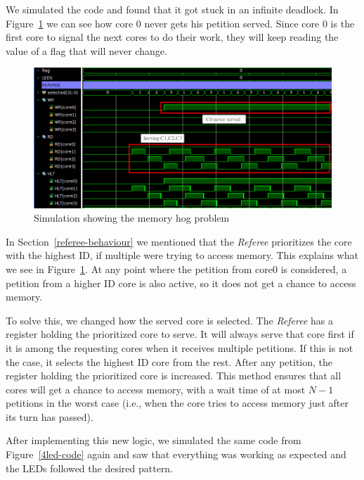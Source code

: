 We simulated the code and found that it got stuck in an infinite deadlock.
In Figure~\ref{4led-sim-bad} we can see how core 0 never gets his petition served.
Since core 0 is the first core to signal the next cores to do their work, they will keep reading the value of a flag that will never change.

\begin{figure}[h!]
    \centering
    \includegraphics[width=1.0\textwidth]{images/flag4_sim_bad_crop_arrow.png}
    \caption{Simulation showing the memory hog problem}
    \label{4led-sim-bad}
\end{figure}

In Section~\ref{referee-behaviour} we mentioned that the \textit{Referee} prioritizes the core with the highest ID, if multiple were trying to access memory.
This explains what we see in Figure~\ref{4led-sim-bad}.
At any point where the petition from core0 is considered, a petition from a higher ID core is also active, so it does not get a chance to access memory.

To solve this, we changed how the served core is selected.
The \textit{Referee} has a register holding the prioritized core to serve.
It will always serve that core first if it is among the requesting cores when it receives multiple petitions.
If this is not the case, it selects the highest ID core from the rest.
After any petition, the register holding the prioritized core is increased.
This method ensures that all cores will get a chance to access memory, with a wait time of at most $N-1$ petitions in the worst case (i.e., when the core tries to access memory just after its turn has passed).


After implementing this new logic, we simulated the same code from Figure~\ref{4led-code} again and saw that everything was working as expected and the LEDs followed the desired pattern.


